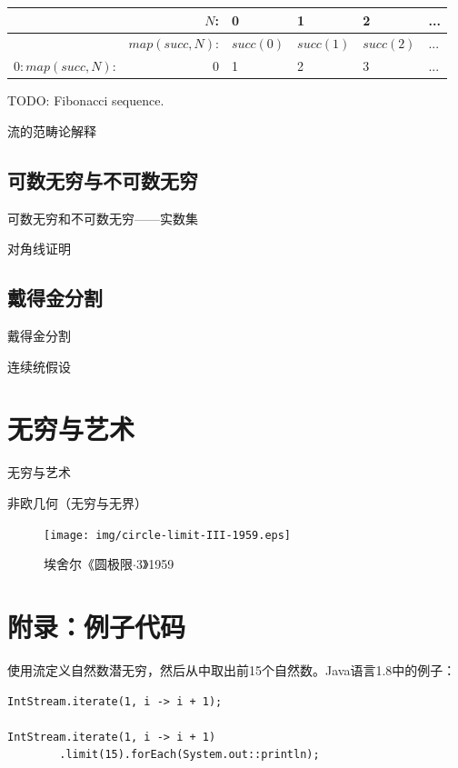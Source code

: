 \documentclass{article}
\begin{document}
\begin{tabular}{|r|r|l|l|l|l|}
\hline
                 & $N$: & 0 & 1 & 2 & ... \\
\hline
                 & $map(succ, N)$: & $succ(0)$ & $succ(1)$ & $succ(2)$ & ... \\
\hline
$0 : map(succ, N)$: & 0 & 1 & 2 & 3 & ... \\
\hline
\end{tabular}

TODO: Fibonacci sequence.

流的范畴论解释

\subsection{可数无穷与不可数无穷}
可数无穷和不可数无穷——实数集

对角线证明

\subsection{戴得金分割}
戴得金分割

连续统假设

\section{无穷与艺术}
无穷与艺术

非欧几何（无穷与无界）

\begin{figure}[htbp]
 \centering
 \texttt{[image: img/circle-limit-III-1959.eps]}
 \captionsetup{labelformat=empty}
 \caption{埃舍尔《圆极限$\cdot$3》1959}
 \label{fig:Penrose-triangle}
\end{figure}

\section{附录：例子代码}

使用流定义自然数潜无穷，然后从中取出前15个自然数。Java语言1.8中的例子：

\lstset{frame=single, language=Java}
\begin{lstlisting}
IntStream.iterate(1, i -> i + 1);

IntStream.iterate(1, i -> i + 1)
        .limit(15).forEach(System.out::println);
\end{lstlisting}
\end{document}
